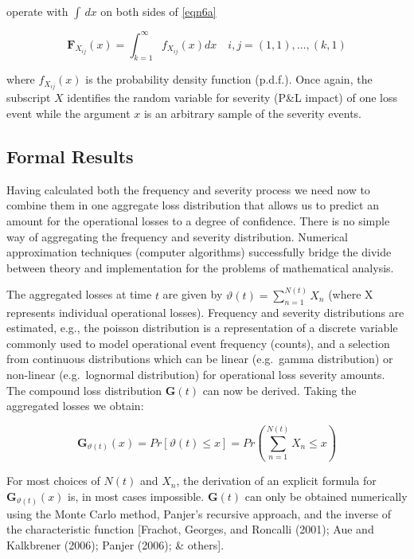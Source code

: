 \documentclass[]{DissertateUSU}
\begin{document}
\begin{itemize}
operate with $\int\,dx$ on both sides of \ref{eqn6a}

\singlespacing
\begin{equation}
\mathbf{F}_{X_{ij}}(x)=\int_{k=1}^{\infty} f_{X_{ij}}(x)dx \quad{i,j}= (1,1),\ldots, (k,1)\label{eqn6b}
\end{equation}
\doublespacing

where $f_{X_{ij}}(x)$ is the probability density function (p.d.f.). Once again, the subscript $X$ identifies the random variable for severity (P\&L impact) of one loss event while the argument $x$ is an arbitrary sample of the severity events.
\end{itemize}

\subsection{Formal Results}

Having calculated both the frequency and severity process we need now to
combine them in one aggregate loss distribution that allows us to
predict an amount for the operational losses to a degree of confidence.
There is no simple way of aggregating the frequency and severity
distribution. Numerical approximation techniques (computer algorithms)
successfully bridge the divide between theory and implementation for the
problems of mathematical analysis.\medskip

The aggregated losses at time \(t\) are given by
\(\vartheta(t) = \sum_{n=1}^{N(t)} X_{n}\) (where X represents
individual operational losses). Frequency and severity distributions are
estimated, e.g., the poisson distribution is a representation of a
discrete variable commonly used to model operational event frequency
(counts), and a selection from continuous distributions which can be
linear (e.g.~gamma distribution) or non-linear (e.g.~lognormal
distribution) for operational loss severity amounts. The compound loss
distribution \(\mathbf{G}(t)\) can now be derived. Taking the aggregated
losses we obtain:

\singlespacing 

\begin{equation}\label{Compound_losses}
\mathbf{G}_{\vartheta(t)}(x)=Pr[\vartheta(t)\leq x]=Pr\left(\sum_{n=1}^{N(t)}X_{n} \leq x\right)
\end{equation}

\doublespacing

For most choices of \(N(t)\) and \(X_{n}\), the derivation of an
explicit formula for \(\mathbf{G}_{\vartheta(t)}(x)\) is, in most cases
impossible. \(\mathbf{G}(t)\) can only be obtained numerically using the
Monte Carlo method, Panjer's recursive approach, and the inverse of the
characteristic function {[}Frachot, Georges, and Roncalli (2001); Aue
and Kalkbrener (2006); Panjer (2006); \& others{]}. \medskip
\end{document}
